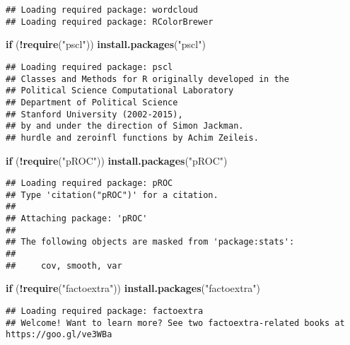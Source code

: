 \documentclass[
]{article}
\newenvironment{Shaded}{\begin{snugshade}}{\end{snugshade}}
\newcommand{\ControlFlowTok}[1]{\textcolor[rgb]{0.13,0.29,0.53}{\textbf{#1}}}
\newcommand{\FunctionTok}[1]{\textcolor[rgb]{0.13,0.29,0.53}{\textbf{#1}}}
\newcommand{\NormalTok}[1]{#1}
\newcommand{\SpecialCharTok}[1]{\textcolor[rgb]{0.81,0.36,0.00}{\textbf{#1}}}
\newcommand{\StringTok}[1]{\textcolor[rgb]{0.31,0.60,0.02}{#1}}
\begin{document}
\begin{verbatim}
## Loading required package: wordcloud
## Loading required package: RColorBrewer
\end{verbatim}

\begin{Shaded}
\begin{Highlighting}[]
\ControlFlowTok{if}\NormalTok{ (}\SpecialCharTok{!}\FunctionTok{require}\NormalTok{(}\StringTok{"pscl"}\NormalTok{)) }\FunctionTok{install.packages}\NormalTok{(}\StringTok{"pscl"}\NormalTok{)}
\end{Highlighting}
\end{Shaded}

\begin{verbatim}
## Loading required package: pscl
## Classes and Methods for R originally developed in the
## Political Science Computational Laboratory
## Department of Political Science
## Stanford University (2002-2015),
## by and under the direction of Simon Jackman.
## hurdle and zeroinfl functions by Achim Zeileis.
\end{verbatim}

\begin{Shaded}
\begin{Highlighting}[]
\ControlFlowTok{if}\NormalTok{ (}\SpecialCharTok{!}\FunctionTok{require}\NormalTok{(}\StringTok{"pROC"}\NormalTok{)) }\FunctionTok{install.packages}\NormalTok{(}\StringTok{"pROC"}\NormalTok{)}
\end{Highlighting}
\end{Shaded}

\begin{verbatim}
## Loading required package: pROC
## Type 'citation("pROC")' for a citation.
## 
## Attaching package: 'pROC'
## 
## The following objects are masked from 'package:stats':
## 
##     cov, smooth, var
\end{verbatim}

\begin{Shaded}
\begin{Highlighting}[]
\ControlFlowTok{if}\NormalTok{ (}\SpecialCharTok{!}\FunctionTok{require}\NormalTok{(}\StringTok{"factoextra"}\NormalTok{)) }\FunctionTok{install.packages}\NormalTok{(}\StringTok{"factoextra"}\NormalTok{)}
\end{Highlighting}
\end{Shaded}

\begin{verbatim}
## Loading required package: factoextra
## Welcome! Want to learn more? See two factoextra-related books at https://goo.gl/ve3WBa
\end{verbatim}
\end{document}
